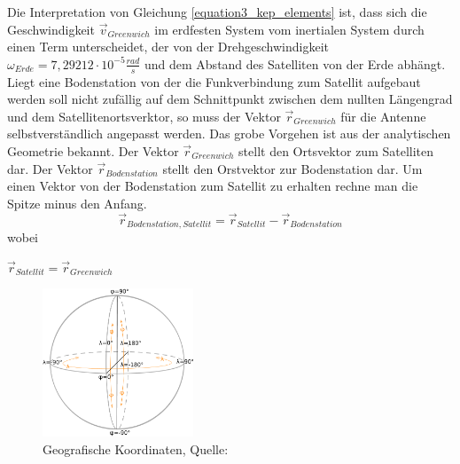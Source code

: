 Die Interpretation von Gleichung \ref{equation3_kep_elements} ist, dass sich die Geschwindigkeit \ensuremath{\vec{v}_{Greenwich}} im erdfesten System vom inertialen System durch einen Term unterscheidet, der von der Drehgeschwindigkeit \ensuremath{\omega_{Erde}=7,29212\cdot 10^{-5}\frac{rad}{s}} und dem Abstand des Satelliten von der Erde abhängt. 
\newpar
Liegt eine Bodenstation von der die Funkverbindung zum Satellit aufgebaut werden soll nicht zufällig auf dem Schnittpunkt zwischen dem nullten Längengrad und dem Satellitenortsverktor, so muss der Vektor \ensuremath{\vec{r}_{Greenwich}} für die Antenne selbstverständlich angepasst werden. Das grobe Vorgehen ist aus der analytischen Geometrie bekannt. Der Vektor \ensuremath{\vec{r}_{Greenwich}} stellt den Ortsvektor zum Satelliten dar. Der Vektor \ensuremath{\vec{r}_{Bodenstation}} stellt den Orstvektor zur Bodenstation dar. Um einen Vektor von der Bodenstation zum Satellit zu erhalten rechne man die Spitze minus den Anfang.
\begin{equation}
	\vec{r}_{Bodenstation,Satellit}=\vec{r}_{Satellit}-\vec{r}_{Bodenstation}
\end{equation} 
wobei 
\begin{center}
	\begin{math}
		\vec{r}_{Satellit}=\vec{r}_{Greenwich}
	\end{math}
\end{center}
\begin{figure}[h]                                                                           %
	\centering                                                                            	%
	\includegraphics[width=0.4\textwidth]{./images/geographic_coordinates.jpg}              %
	\caption[Geografische Koordinaten]{Geografische Koordinaten, Quelle: \cite{Wiki:Geo}}                        												%
	\label{fig:geo}                                                                         %
\end{figure}                                                                              	%
